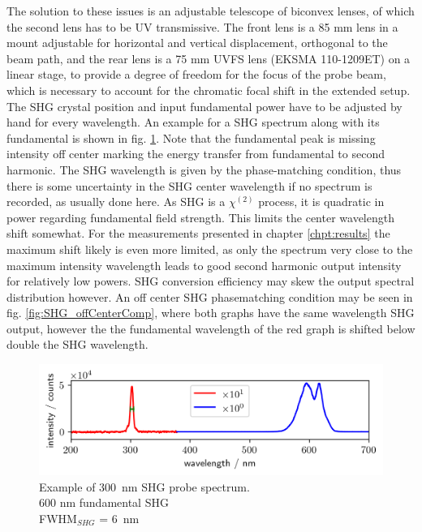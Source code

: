 \documentclass[twoside,openright,listof=numbered]{scrreprt}
\begin{document}
The solution to these issues is an adjustable telescope of biconvex lenses, of which the second lens has to be UV transmissive. The front lens is a 85 mm lens in a mount adjustable for horizontal and vertical displacement, orthogonal to the beam path, and the rear lens is a 75 mm UVFS lens (EKSMA 110-1209ET) on a linear stage, to provide a degree of freedom for the focus of the probe beam, which is necessary to account for the chromatic focal shift in the extended setup.\\
The SHG crystal position and input fundamental power have to be adjusted by hand for every wavelength. An example for a SHG spectrum along with its fundamental is shown in fig. \ref{fig:specSHG300nm}. Note that the fundamental peak is missing intensity off center marking the energy transfer from fundamental to second harmonic. The SHG wavelength is given by the phase-matching condition, thus there is some uncertainty in the SHG center wavelength if no spectrum is recorded, as usually done here. As SHG is a $\chi^{\left(2\right)}$ process, it is quadratic in power regarding fundamental field strength. This limits the center wavelength shift somewhat. For the measurements presented in chapter \ref{chpt:results} the maximum shift likely is even more limited, as only the spectrum very close to the maximum intensity wavelength leads to good second harmonic output intensity for relatively low powers. SHG conversion efficiency may skew the output spectral distribution however. An off center SHG phasematching condition may be seen in fig. \ref{fig:SHG_offCenterComp}, where both graphs have the same wavelength SHG output, however the the fundamental wavelength of the red graph is shifted below double the SHG wavelength. 
\begin{figure}[hbtp]
\centering
\includegraphics[scale=1]{images/spectra/SpectrumExampleNoFilter_300nm.png}
\caption[Example of \qty{300}{\nano\meter} SHG probe spectrum.]{Example of \qty{300}{\nano\meter} SHG probe spectrum.\\600 nm fundamental SHG\label{fig:specSHG300nm}\\ FWHM$_{SHG}$ = \SI{6}{\nano\meter}}
\end{figure}
\end{document}
